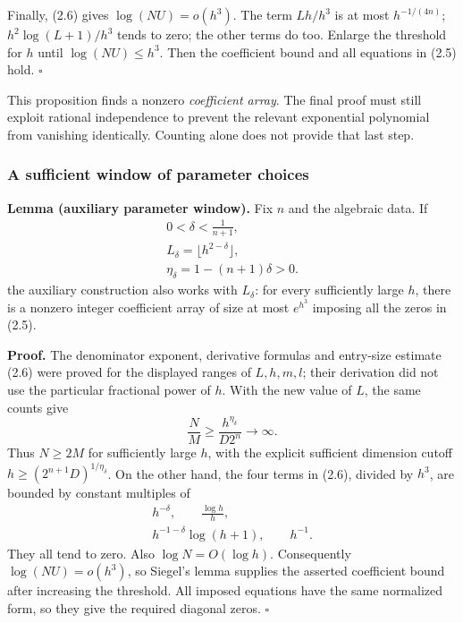 \documentclass[
  11pt,
  a4paper,
]{article}
\begin{document}
Finally, (2.6) gives \(\log(NU)=o(h^3)\). The term \(Lh/h^3\) is at most
\(h^{-1/(4n)}\); \(h^2\log(L+1)/h^3\) tends to zero; the other terms do
too. Enlarge the threshold for \(h\) until \(\log(NU)\le h^3\). Then the
coefficient bound and all equations in (2.5) hold. \(\square\)

This proposition finds a nonzero \emph{coefficient array}. The final
proof must still exploit rational independence to prevent the relevant
exponential polynomial from vanishing identically. Counting alone does
not provide that last step.

\subsubsection{A sufficient window of parameter
choices}\label{a-sufficient-window-of-parameter-choices}

\textbf{Lemma (auxiliary parameter window).} Fix \(n\) and the algebraic
data. If \[
\begin{gathered}
0<\delta<\frac1{n+1},\\
L_\delta=\lfloor h^{2-\delta}\rfloor,\\
\eta_\delta=1-(n+1)\delta>0.
\end{gathered} \tag{2.9}
\] the auxiliary construction also works with \(L_\delta\): for every
sufficiently large \(h\), there is a nonzero integer coefficient array
of size at most \(e^{h^3}\) imposing all the zeros in (2.5).

\textbf{Proof.} The denominator exponent, derivative formulas and
entry-size estimate (2.6) were proved for the displayed ranges of
\(L,h,m,l\); their derivation did not use the particular fractional
power of \(h\). With the new value of \(L\), the same counts give \[
\frac NM\ge\frac{h^{\eta_\delta}}{D2^n}\longrightarrow\infty.
\] Thus \(N\ge2M\) for sufficiently large \(h\), with the explicit
sufficient dimension cutoff \(h\ge(2^{n+1}D)^{1/\eta_\delta}\). On the
other hand, the four terms in (2.6), divided by \(h^3\), are bounded by
constant multiples of \[
\begin{gathered}
h^{-\delta},\qquad \frac{\log h}{h},\\
h^{-1-\delta}\log(h+1),\qquad h^{-1}.
\end{gathered}
\] They all tend to zero. Also \(\log N=O(\log h)\). Consequently
\(\log(NU)=o(h^3)\), so Siegel's lemma supplies the asserted coefficient
bound after increasing the threshold. All imposed equations have the
same normalized form, so they give the required diagonal zeros.
\(\square\)
\end{document}
